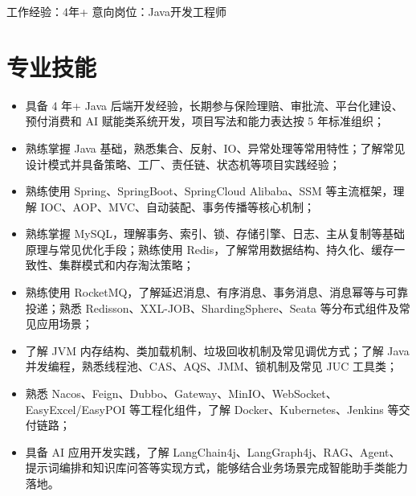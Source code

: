 \documentclass[11pt]{resume}
\begin{document}

\hspace*{2.8cm}{姓名：袁健伟}
\hspace*{0.5cm}{电话：18862057365}
\hspace*{0.5cm}{邮箱：2754742370@qq.com}
\newline \hspace*{3.9cm} 工作经验：4年+
\hspace*{0.5cm} 意向岗位：Java开发工程师

\section{专业技能}
\begin{itemize}
\item\newline 具备 4 年+ Java 后端开发经验，长期参与保险理赔、审批流、平台化建设、预付消费和 AI 赋能类系统开发，项目写法和能力表达按 5 年标准组织；
\item\newline 熟练掌握 Java 基础，熟悉集合、反射、IO、异常处理等常用特性；了解常见设计模式并具备策略、工厂、责任链、状态机等项目实践经验；
\item\newline 熟练使用 Spring、SpringBoot、SpringCloud Alibaba、SSM 等主流框架，理解 IOC、AOP、MVC、自动装配、事务传播等核心机制；
\item\newline 熟练掌握 MySQL，理解事务、索引、锁、存储引擎、日志、主从复制等基础原理与常见优化手段；熟练使用 Redis，了解常用数据结构、持久化、缓存一致性、集群模式和内存淘汰策略；
\item\newline 熟练使用 RocketMQ，了解延迟消息、有序消息、事务消息、消息幂等与可靠投递；熟悉 Redisson、XXL-JOB、ShardingSphere、Seata 等分布式组件及常见应用场景；
\item\newline 了解 JVM 内存结构、类加载机制、垃圾回收机制及常见调优方式；了解 Java 并发编程，熟悉线程池、CAS、AQS、JMM、锁机制及常见 JUC 工具类；
\item\newline 熟悉 Nacos、Feign、Dubbo、Gateway、MinIO、WebSocket、EasyExcel/EasyPOI 等工程化组件，了解 Docker、Kubernetes、Jenkins 等交付链路；
\item\newline 具备 AI 应用开发实践，了解 LangChain4j、LangGraph4j、RAG、Agent、提示词编排和知识库问答等实现方式，能够结合业务场景完成智能助手类能力落地。
\end{itemize}
\end{document}
